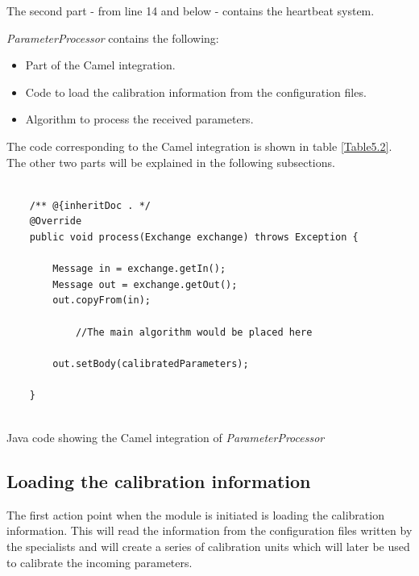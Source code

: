 The second part - from line 14 and below - contains the heartbeat system.


\emph{ParameterProcessor} contains the following:
\begin{itemize}
\item Part of the Camel integration.
\item Code to load the calibration information from the configuration files.
\item Algorithm to process the received parameters.
\end{itemize}

The code corresponding to the Camel integration is shown in table \ref{Table5.2}. The other two parts will be explained in the following subsections.

\begin{table}[H]
\lstset{language=Java}
\begin{lstlisting}

    /** @{inheritDoc . */
    @Override
    public void process(Exchange exchange) throws Exception {

        Message in = exchange.getIn();
        Message out = exchange.getOut();
        out.copyFrom(in);

    		//The main algorithm would be placed here    

        out.setBody(calibratedParameters);

	}


\end{lstlisting}
\caption{Java code showing the Camel integration of \emph{ParameterProcessor} }
\label{Table5.2}
\end{table}
\pagebreak
\subsection{Loading the calibration information}

The first action point when the module is initiated is loading the calibration information. This will read the information from the configuration files written by the specialists and will create a series of calibration units which will later be used to calibrate the incoming parameters.

